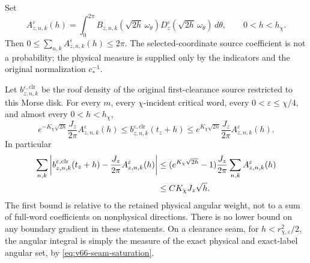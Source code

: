 Set
\begin{equation}\label{eq:v66-nonlinear-angular}
 A_{z,n,k}^{\varepsilon}(h)=
 \int_0^{2\pi} B_{z,n,k}(\sqrt{2h}\,\omega_\theta)
                  D_z^\varepsilon(\sqrt{2h}\,\omega_\theta)\,d\theta,
             \qquad 0<h<h_\chi.
\end{equation}
Then $0\le\sum_{n,k}A_{z,n,k}^{\varepsilon}(h)\le2\pi$.
The selected-coordinate source coefficient is not a probability;
the physical measure is supplied only by the indicators and the
original normalization $c_*^{-1}$.

\begin{theorem}
\label{thm:v66-nonlinear-profile}
Let $b_{z,n,k}^{\varepsilon,\mathrm{clr}}$ be the roof density of
the original first-clearance source restricted to this Morse disk.
For every $m$, every $\chi$-incident critical word, every
$0<\varepsilon\le\chi/4$, and almost every $0<h<h_\chi$,
\begin{equation}\label{eq:v66-multiplicative-profile}
 e^{-K_\chi\sqrt{2h}}\frac{J_z}{2\pi}A_{z,n,k}^{\varepsilon}(h)
 \le b_{z,n,k}^{\varepsilon,\mathrm{clr}}(t_z+h)
 \le e^{K_\chi\sqrt{2h}}\frac{J_z}{2\pi}A_{z,n,k}^{\varepsilon}(h).
\end{equation}
In particular
\begin{align}\label{eq:v66-vector-profile-error}
 \sum_{n,k}\left|b_{z,n,k}^{\varepsilon,\mathrm{clr}}(t_z+h)
           -\frac{J_z}{2\pi}A_{z,n,k}^{\varepsilon}(h)\right|
 &\le (e^{K_\chi\sqrt{2h}}-1)
                 \frac{J_z}{2\pi}\sum_{n,k}A_{z,n,k}^{\varepsilon}(h)
 \notag\\
 &\le C K_\chi J_z\sqrt h.
\end{align}
The first bound is relative to the retained physical angular weight,
not to a sum of full-word coefficients on nonphysical directions.
There is no lower bound on any boundary gradient in these statements.
On a clearance seam, for $h<r_{\chi,\varepsilon}^2/2$, the angular
integral is simply the measure of the exact physical and exact-label
angular set, by \eqref{eq:v66-seam-saturation}.
\end{theorem}

